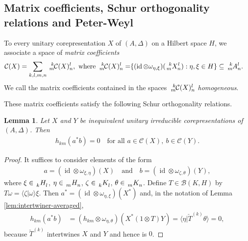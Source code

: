 \documentclass[11pt]{article}
\DeclareMathOperator{\id}{id}
\newcommand{\Gr}[5]{\,\tensor*[^{#2}_{#4}]{#1}{^{#3}_{#5}}}%
\newcommand{\Grd}[3]{\Gr{#1}{}{}{#2}{#3}}
\newtheorem{Lem}[Theorem]{Lemma}
\theoremstyle{definition}
\numberwithin{equation}{section}
\begin{document}
\subsection{Matrix coefficients, Schur orthogonality relations and Peter-Weyl}


To every unitary corepresentation $X$ of $(A,\Delta)$ on a Hilbert space $H$, we associate a space
of \emph{matrix coefficients}
\begin{align*}
\mathcal{C}(X) = \sum_{k,l,m,n}  \Gr{\mathcal{C}(X)}{k}{l}{m}{n},
\text{ where } \Gr{\mathcal{C}(X)}{k}{l}{m}{n} = \span \{ (\id \otimes
  \omega_{\eta,\xi})(\Gr{X}{k}{l}{m}{n}) : \eta,\xi \in H\} \subseteq
  \Gr{A}{k}{l}{m}{n}.
\end{align*}
We call the matrix coefficients contained in the spaces $\Gr{\mathcal{C}(X)}{k}{l}{m}{n}$
\emph{homogeneous}.

These matrix coefficients satisfy the following Schur orthogonality relations.
\begin{Lem}
  Let $X$ and $Y$ be inequivalent unitary irreducible corepresentations of $(A,\Delta)$. Then
  \begin{align*}
    h_{km}(a^{*}b) = 0 \quad \text{for all } a\in \mathcal{C}(X), \ b\in \mathcal{C}(Y).
  \end{align*}
\end{Lem}
\begin{proof}
It suffices to  consider elements of the form
  \begin{align*}
    a = (\id\otimes \omega_{\xi,\eta})(X) \quad\text{and}  \quad b=(\id \otimes \omega_{\zeta,\theta})(Y),
  \end{align*}
  where $\xi \in \Grd{H}{k}{l}$, $\eta\in \Grd{H}{m}{n}$, $\zeta \in \Grd{K}{k}{l}$, $\theta \in
  \Grd{K}{m}{n}$. Define $T\in \mathcal{B}(K,H)$ by $T\omega = \langle \zeta|\omega\rangle \xi$. 
  Then $a^{*}=(\id \otimes \omega_{\eta,\xi})(X^{*})$ and, in the notation of Lemma \ref{lem:intertwiner-averaged},
  \begin{align*}
    h_{km}(a^{*}b) &= (h_{km} \otimes \omega_{\eta,\theta})(X^{*}(1\otimes T)Y) 
 = \langle \eta|
     \check{T}^{(k)} \theta\rangle = 0,
  \end{align*}
  because $\check{T}^{(k)}$ intertwines $X$  and $Y$  and hence is $0$.
\end{proof}
\end{document}

